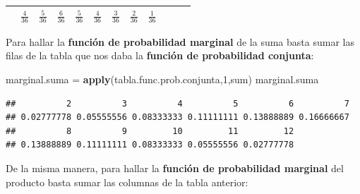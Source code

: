 \documentclass[]{book}
\newenvironment{Shaded}{\begin{snugshade}}{\end{snugshade}}
\newcommand{\DecValTok}[1]{\textcolor[rgb]{0.00,0.00,0.81}{#1}}
\newcommand{\KeywordTok}[1]{\textcolor[rgb]{0.13,0.29,0.53}{\textbf{#1}}}
\newcommand{\NormalTok}[1]{#1}
\newcommand{\StringTok}[1]{\textcolor[rgb]{0.31,0.60,0.02}{#1}}
\begin{document}
\begin{longtable}[]{@{}llllllllllll@{}}
\begin{minipage}[t]{0.06\columnwidth}
\end{minipage} & \begin{minipage}[t]{0.06\columnwidth}\raggedright
\(\frac{4}{36}\)\strut
\end{minipage} & \begin{minipage}[t]{0.06\columnwidth}\raggedright
\(\frac{5}{36}\)\strut
\end{minipage} & \begin{minipage}[t]{0.06\columnwidth}\raggedright
\(\frac{6}{36}\)\strut
\end{minipage} & \begin{minipage}[t]{0.06\columnwidth}\raggedright
\(\frac{5}{36}\)\strut
\end{minipage} & \begin{minipage}[t]{0.06\columnwidth}\raggedright
\(\frac{4}{36}\)\strut
\end{minipage} & \begin{minipage}[t]{0.06\columnwidth}\raggedright
\(\frac{3}{36}\)\strut
\end{minipage} & \begin{minipage}[t]{0.06\columnwidth}\raggedright
\(\frac{2}{36}\)\strut
\end{minipage} & \begin{minipage}[t]{0.06\columnwidth}\raggedright
\(\frac{1}{36}\)\strut
\end{minipage}\tabularnewline
\bottomrule
\end{longtable}

Para hallar la \textbf{función de probabilidad marginal} de la suma basta sumar las filas de la tabla que nos daba la \textbf{función de probabilidad conjunta}:

\begin{Shaded}
\begin{Highlighting}[]
\NormalTok{marginal.suma =}\StringTok{ }\KeywordTok{apply}\NormalTok{(tabla.func.prob.conjunta,}\DecValTok{1}\NormalTok{,sum)}
\NormalTok{marginal.suma}
\end{Highlighting}
\end{Shaded}

\begin{verbatim}
##          2          3          4          5          6          7 
## 0.02777778 0.05555556 0.08333333 0.11111111 0.13888889 0.16666667 
##          8          9         10         11         12 
## 0.13888889 0.11111111 0.08333333 0.05555556 0.02777778
\end{verbatim}

De la misma manera, para hallar la \textbf{función de probabilidad marginal} del producto basta sumar las columnas de la tabla anterior:
\end{document}
